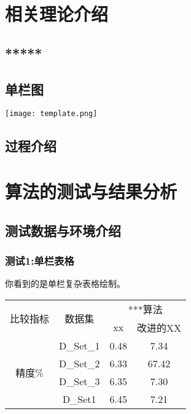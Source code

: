 \documentclass[a4paper,onecolumn,twosize]{article}
\begin{document}
\section{相关理论介绍}     
\subsection{*****}
\subsection{单栏图} 
        \begin{center}

          \texttt{[image: template.png]}\\
          \label{fig1}

        \end{center}

\subsection{过程介绍}
\section{算法的测试与结果分析}
\subsection{测试数据与环境介绍}
\subsubsection{测试1:单栏表格}
你看到的是单栏复杂表格绘制。\\
        \begin{center}
          \label{tab:tabset2}
          \begin{tabular}{cccc}
            \toprule
            \multirow{2}{*}{比较指标}& \multirow{2}{*}{数据集} &
            \multicolumn{2}{c}{***算法} \\
            \cline{3-4}
         & & xx & 改进的XX \\
            \midrule
            \multirow{4}{*}{精度\%}& D\_Set\_1 & 0.48 & 7.34 \\
            & D\_Set\_2 & 6.33 & 67.42 \\
            & D\_Set\_3 & 6.35& 7.30 \\
            & D\_Set1 & 6.45 & 7.21 \\
            \bottomrule
          \end{tabular}
        \end{center}
\par
\end{document}

